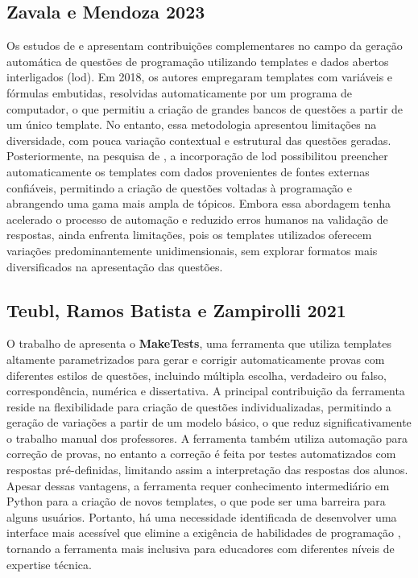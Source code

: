 \subsection{Zavala e Mendoza 2023}

Os estudos de \parencite{zalava2018} e   \parencite{zalava2023}  apresentam contribuições complementares no campo da geração automática de questões de programação utilizando templates e dados abertos interligados (\gls{lod}). Em 2018, os autores empregaram templates com variáveis e fórmulas embutidas, resolvidas automaticamente por um programa de computador, o que permitiu a criação de grandes bancos de questões a partir de um único template. No entanto, essa metodologia apresentou limitações na diversidade, com pouca variação contextual e estrutural das questões geradas. Posteriormente, na pesquisa de \cite{zalava2023}, a incorporação de \gls{lod} possibilitou preencher automaticamente os templates com dados provenientes de fontes externas confiáveis, permitindo a criação de questões voltadas à programação e abrangendo uma gama mais ampla de tópicos. Embora essa abordagem tenha acelerado o processo de automação e reduzido erros humanos na validação de respostas, ainda enfrenta limitações, pois os templates utilizados oferecem variações predominantemente unidimensionais, sem explorar formatos mais diversificados na apresentação das questões.

 \subsection{Teubl, Ramos Batista e Zampirolli 2021}
O trabalho de \parencite{teubl2021}  apresenta o \textbf{MakeTests}, uma ferramenta que utiliza templates altamente parametrizados para gerar e corrigir automaticamente provas com diferentes estilos de questões, incluindo múltipla escolha, verdadeiro ou falso, correspondência, numérica e dissertativa. A principal contribuição da ferramenta reside na flexibilidade para criação de questões individualizadas, permitindo a geração de variações a partir de um modelo básico, o que reduz significativamente o trabalho manual dos professores.  A ferramenta também utiliza automação para correção de provas, no entanto a correção é feita por testes automatizados com respostas pré-definidas, limitando assim a interpretação das respostas dos alunos. Apesar dessas vantagens, a ferramenta requer conhecimento intermediário em Python para a criação de novos templates, o que pode ser uma barreira para alguns usuários. Portanto, há uma necessidade identificada de desenvolver uma interface mais acessível que elimine a exigência de habilidades de programação , tornando a ferramenta mais inclusiva para educadores com diferentes níveis de expertise técnica. 

